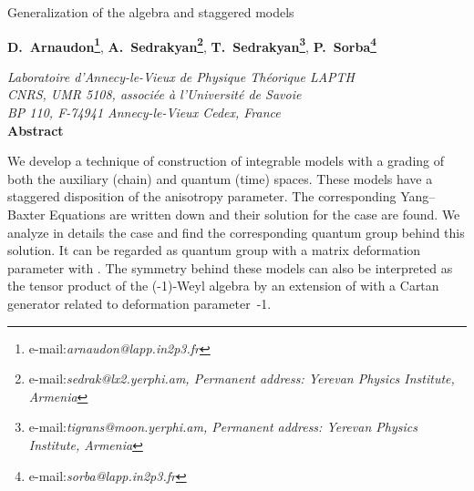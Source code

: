 \documentclass[a4paper,a4paper]{article}
\def\ZZ{{\mathbb Z}}
\begin{document}
\pagestyle{empty}

\begin{center} 
\textsf{\Large 
{Generalization of the \coordHE{} algebra and staggered models}} 
  
\vspace{36pt}
{\bf D.~Arnaudon\footnote{e-mail:{\sl arnaudon@lapp.in2p3.fr}}},
{\bf A.~Sedrakyan\footnote{e-mail:{\sl sedrak@lx2.yerphi.am,
Permanent address: Yerevan Physics Institute, Armenia}}},
{\bf T.~Sedrakyan\footnote{e-mail:{\sl tigrans@moon.yerphi.am,
Permanent address: Yerevan Physics Institute, Armenia}}},
{\bf P.~Sorba\footnote{e-mail:{\sl sorba@lapp.in2p3.fr}}}\\  

\vspace{30pt}

\emph{Laboratoire d'Annecy-le-Vieux de Physique Th{\'e}orique LAPTH}
\\
\emph{CNRS, UMR 5108, associ{\'e}e {\`a} l'Universit{\'e} de Savoie}
\\
\emph{BP 110, F-74941 Annecy-le-Vieux Cedex, France}
\\

\vfill
{\bf Abstract}
\end{center}

We develop a technique of construction of integrable models
with a \myHighlight{$\ZZ_2$}\coordHE{} grading of both the auxiliary (chain) and quantum (time)
spaces. These models have a staggered disposition of the anisotropy
parameter. The corresponding Yang--Baxter Equations are written
down and their solution for the \coordHE{} case are found. We analyze
in details the \coordHE{} case and find the corresponding
quantum group behind this solution. It can be regarded as
quantum \coordHE{} group with a matrix deformation parameter
\coordHE{} with \coordHE{}.
The symmetry behind these models can also be interpreted as the tensor
product of the (-1)-Weyl algebra by an extension of \coordHE{}
with a Cartan generator related to deformation parameter~-1. 

\vfill
{}

\newpage
\pagestyle{plain}
\setcounter{page}{1}


\end{document}
